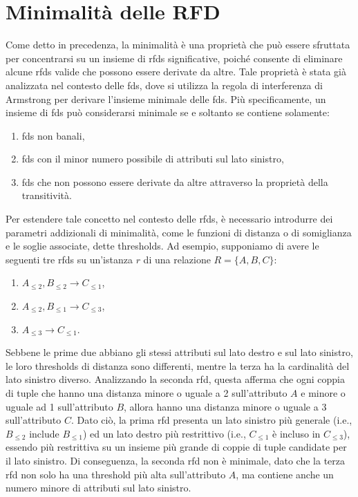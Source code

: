 \section{Minimalit\`{a} delle RFD}
Come detto in precedenza, la minimalit\`{a} \`{e} una propriet\`{a} che pu\`{o} essere sfruttata per concentrarsi su un insieme di \acrshort{rfds} significative, poich\'{e} consente di eliminare alcune \acrshort{rfds} valide che possono essere derivate da altre. Tale propriet\`{a} \`{e} stata gi\`{a} analizzata nel contesto delle \acrshort{fds}, dove si utilizza la regola di interferenza di Armstrong per derivare l'insieme minimale delle \acrshort{fds}. Pi\`{u} specificamente, un insieme di \acrshort{fds} pu\`{o} considerarsi minimale se e soltanto se contiene solamente:
\begin{enumerate}
    \item \acrshort{fds} non banali,
    \item \acrshort{fds} con il minor numero possibile di attributi sul lato sinistro,
    \item \acrshort{fds} che non possono essere derivate da altre attraverso la propriet\`{a} della transitivit\`{a}.
\end{enumerate}\par
Per estendere tale concetto nel contesto delle \acrshort{rfds}, \`{e} necessario introdurre dei parametri addizionali di minimalit\`{a}, come le funzioni di distanza o di somiglianza e le soglie associate, dette thresholds. Ad esempio, supponiamo di avere le seguenti tre \acrshort{rfds} su un'istanza $r$ di una relazione $R=\{A,B,C\}$:
\begin{enumerate}
    \item $A_{\leq2},B_{\leq2}\rightarrow C_{\leq1}$,
    \item $A_{\leq2},B_{\leq1}\rightarrow C_{\leq3}$,
    \item $A_{\leq3}\rightarrow C_{\leq1}$.
\end{enumerate}
Sebbene le prime due abbiano gli stessi attributi sul lato destro e sul lato sinistro, le loro thresholds di distanza sono differenti, mentre la terza ha la cardinalit\`{a} del lato sinistro diverso. Analizzando la seconda \acrshort{rfd}, questa afferma che ogni coppia di tuple che hanno una distanza minore o uguale a 2 sull'attributo $A$ e minore o uguale ad 1 sull'attributo $B$, allora hanno una distanza minore o uguale a 3 sull'attributo $C$. Dato ci\`{o}, la prima \acrshort{rfd} presenta un lato sinistro pi\`{u} generale (i.e., $B_{\leq2}$ include $B_{\leq1}$) ed un lato destro pi\`{u} restrittivo (i.e., $C_{\leq1}$ \`{e} incluso in $C_{\leq3}$), essendo pi\`{u} restrittiva su un insieme pi\`{u} grande di coppie di tuple candidate per il lato sinistro. Di conseguenza, la seconda \acrshort{rfd} non \`{e} minimale, dato che la terza \acrshort{rfd} non solo ha una threshold pi\`{u} alta sull'attributo $A$, ma contiene anche un numero minore di attributi sul lato sinistro.\par
